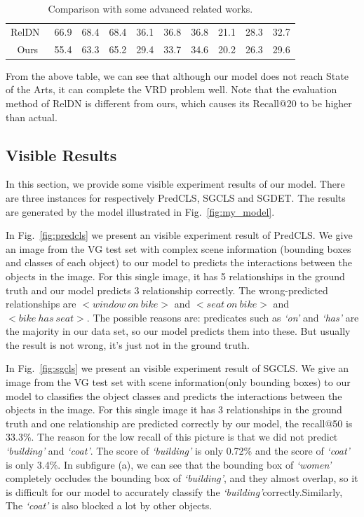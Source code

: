 \begin{table}[!h]
{\begin{tabular}{c|ccc|ccc|ccc}
		RelDN~\cite{zhang2019graphical}                   & 66.9                 & 68.4                 & 68.4                  & 36.1                 & 36.8                 & 36.8                  & 21.1                 & 28.3                 & 32.7                  \\
		Ours                   & 55.4       & 63.3       & 65.2        & 29.4      & 33.7      &34.6              & 20.2                    & 26.3                    & 29.6                     \\ \hline
	\end{tabular}}

\caption[Comparison with some advanced related works.]{Comparison with some advanced related works.}
\label{tab:compare_recall}
\end{table}

From the above table, we can see that although our model does not reach State of the Arts, it can complete the VRD problem well. Note that the evaluation method of RelDN is different from ours, which causes its Recall@20 to be higher than actual.

\subsection{Visible Results}
In this section, we provide some visible experiment results of our model. There are three instances for respectively PredCLS, SGCLS and SGDET. The results are generated by the model illustrated in Fig.~\ref{fig:my_model}.

In Fig.~\ref{fig:predcls} we present an visible experiment result of PredCLS. We give an image from the VG test set with complex scene information (bounding boxes and classes of each object) to our  model to predicts the interactions between the objects in the image. For this single image, it has 5 relationships in the ground truth and our model predicts 3 relationship correctly. The wrong-predicted relationships are $ <window\ on\ bike >$ and $<seat\ on\ bike>$ and $<bike\ has\ seat>$. The possible reasons are: predicates such as \textit{`on' }and \textit{`has' } are the majority in our data set, so our model predicts them into these. But usually the result is not wrong, it's just not in the ground truth.

In Fig.~\ref{fig:sgcls}  we present an visible experiment result of SGCLS. We give an image from the VG test set with scene information(only bounding boxes) to our  model to classifies the object classes and predicts the interactions between the objects in the image. For this single image it has 3 relationships in the ground truth and one relationship are predicted correctly by our model, the recall@50 is 33.3\%. The reason for the low recall of this picture is that we did not predict \textit{`building'} and \textit{`coat'}. The score of \textit{`building'} is only 0.72\% and the score of \textit{`coat'} is only 3.4\%. In subfigure (a), we can see that the bounding box of \textit{`women'} completely occludes the bounding box of \textit{`building'}, and they almost overlap, so it is difficult for our model to accurately classify the \textit{`building'}correctly.Similarly,
The \textit{`coat'} is also blocked a lot by other objects.
 

